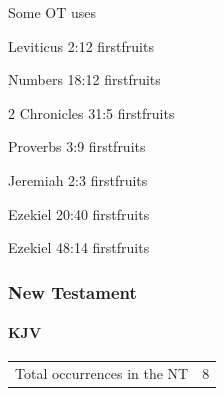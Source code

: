 				\begin{compactdesc}
					\item[Some OT uses] \textbf{}
						\begin{compactdesc}
							\item[Leviticus 2:12] firstfruits
							\item[Numbers 18:12] firstfruits
							\item[2 Chronicles 31:5] firstfruits
							\item[Proverbs 3:9] firstfruits
							\item[Jeremiah 2:3] firstfruits
							\item[Ezekiel 20:40] firstfruits
							\item[Ezekiel 48:14] firstfruits
						\end{compactdesc}
				\end{compactdesc}
			
		
		
	\subsubsection{New Testament} %
		\label{FIRSTFRUITS-NT}
	
		\paragraph{KJV}
			\label{FIRSTFRUITS-NT-KJV}
	
			\begin{tabular}{ll}
				Total occurrences in the NT & 8
			\end{tabular}
			

